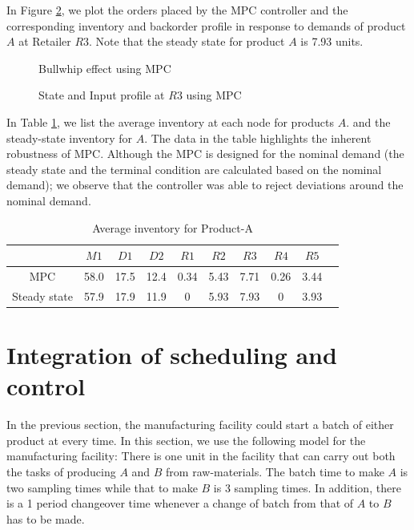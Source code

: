 \documentclass{elsarticle}
\theoremstyle{definition}
\begin{document}
In Figure \ref{fig:esc:Order}, we plot the orders placed by the MPC
controller and the corresponding inventory and backorder profile in response to
demands of product $A$ at Retailer $R3$. Note that the steady state
for product $A$ is 7.93 units.


\begin{figure}
\centering
\scriptsize
{\resizebox{1\textwidth}{!}{}}
\caption{Bullwhip effect using MPC}
\label{fig:esc:bullwhip}
\end{figure}
\begin{figure}
\scriptsize
{\resizebox{1\textwidth}{!}{}}
\caption{State and Input  profile at $R3$ using MPC}
\label{fig:esc:Order}
\end{figure}




In Table \ref{tab:esc:avgA}, we list the average inventory at each
node for products $A$. and the steady-state inventory for $A$.  The
data in the table highlights the inherent robustness of MPC. Although
the MPC is designed for the nominal demand (the steady state and the
terminal condition are calculated based on the nominal demand); we
observe that the controller was able to reject deviations around the
nominal demand.

\begin{table}[h]
\caption{Average inventory for Product-A}
\label{tab:esc:avgA}
\begin{center}
\begin{tabular}{cccccccccc}\toprule
 &$M1$&$D1$&$D2$&$R1$&$R2$&$R3$&$R4$&$R5$\\ \midrule
MPC&58.0&17.5&12.4&0.34&5.43&7.71&0.26&3.44\\ 
Steady state&57.9&17.9&11.9&0 &5.93&7.93&0&3.93\\
\bottomrule 
\end{tabular}
\end{center}
\end{table}

\section{Integration of scheduling and control}
\label{sec:multi:integration}
In the previous section, the manufacturing facility could start a
batch of either product at every time. In this section, we use the
following model for the manufacturing facility: There is one unit in
the facility that can carry out both the tasks of producing $A$ and
$B$ from raw-materials. The batch time to make $A$ is two sampling
times while that to make $B$ is 3 sampling times. In addition, there
is a 1 period changeover time whenever a change of batch from that of
$A$ to $B$ has to be made.  
\end{document}
